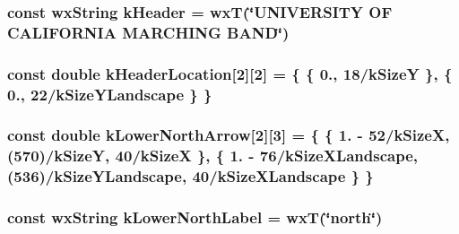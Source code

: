 \hypertarget{a00222_af31a0bc1a0accdc64307e7beed9fe82b}{
\subsubsection[{k\-Header}]{\setlength{\rightskip}{0pt plus 5cm}const wx\-String k\-Header = wx\-T(\char`\"{}U\-N\-I\-V\-E\-R\-S\-I\-T\-Y O\-F C\-A\-L\-I\-F\-O\-R\-N\-I\-A M\-A\-R\-C\-H\-I\-N\-G B\-A\-N\-D\char`\"{})\hspace{0.3cm}{\ttfamily [static]}}}\label{a00222_af31a0bc1a0accdc64307e7beed9fe82b}
\hypertarget{a00222_af55bc4816db744c8a0559fabc09aa086}{
\subsubsection[{k\-Header\-Location}]{\setlength{\rightskip}{0pt plus 5cm}const double k\-Header\-Location\mbox{[}2\mbox{]}\mbox{[}2\mbox{]} = \{ \{ 0., 18/{\bf k\-Size\-Y} \}, \{ 0., 22/{\bf k\-Size\-Y\-Landscape} \} \}\hspace{0.3cm}{\ttfamily [static]}}}\label{a00222_af55bc4816db744c8a0559fabc09aa086}
\hypertarget{a00222_a1b7ff2c2a84b6576e5d246538066d545}{
\subsubsection[{k\-Lower\-North\-Arrow}]{\setlength{\rightskip}{0pt plus 5cm}const double k\-Lower\-North\-Arrow\mbox{[}2\mbox{]}\mbox{[}3\mbox{]} = \{ \{ 1. -\/ 52/{\bf k\-Size\-X}, (570)/{\bf k\-Size\-Y}, 40/{\bf k\-Size\-X} \}, \{ 1. -\/ 76/{\bf k\-Size\-X\-Landscape}, (536)/{\bf k\-Size\-Y\-Landscape}, 40/{\bf k\-Size\-X\-Landscape} \} \}\hspace{0.3cm}{\ttfamily [static]}}}\label{a00222_a1b7ff2c2a84b6576e5d246538066d545}
\hypertarget{a00222_a5472454bc01d15a84603c4506a2157a3}{
\subsubsection[{k\-Lower\-North\-Label}]{\setlength{\rightskip}{0pt plus 5cm}const wx\-String k\-Lower\-North\-Label = wx\-T(\char`\"{}north\char`\"{})\hspace{0.3cm}{\ttfamily [static]}}}\label{a00222_a5472454bc01d15a84603c4506a2157a3}
